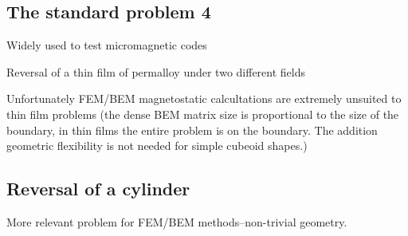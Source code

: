 \subsection{The \mumag standard problem 4}

Widely used to test micromagnetic codes

Reversal of a thin film of permalloy under two different fields

Unfortunately FEM/BEM magnetostatic calcultations are extremely unsuited to thin film problems (the dense BEM matrix size is proportional to the size of the boundary, in thin films the entire problem is on the boundary. The addition geometric flexibility is not needed for simple cubeoid shapes.)


\subsection{Reversal of a cylinder}

More relevant problem for FEM/BEM methods--non-trivial geometry.






